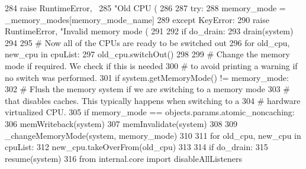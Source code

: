 \begin{DoxyCode}
284             raise RuntimeError, \
285                 "Old CPU (%
286 
287     try:
288         memory_mode = _memory_modes[memory_mode_name]
289     except KeyError:
290         raise RuntimeError, "Invalid memory mode (%
291 
292     if do_drain:
293         drain(system)
294 
295     # Now all of the CPUs are ready to be switched out
296     for old_cpu, new_cpu in cpuList:
297         old_cpu.switchOut()
298 
299     # Change the memory mode if required. We check if this is needed
300     # to avoid printing a warning if no switch was performed.
301     if system.getMemoryMode() != memory_mode:
302         # Flush the memory system if we are switching to a memory mode
303         # that disables caches. This typically happens when switching to a
304         # hardware virtualized CPU.
305         if memory_mode == objects.params.atomic_noncaching:
306             memWriteback(system)
307             memInvalidate(system)
308 
309         _changeMemoryMode(system, memory_mode)
310 
311     for old_cpu, new_cpu in cpuList:
312         new_cpu.takeOverFrom(old_cpu)
313 
314     if do_drain:
315         resume(system)
316 
from internal.core import disableAllListeners
\end{DoxyCode}


